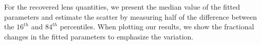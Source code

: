 For the recovered lens quantities, we present the median value of the fitted parameters and estimate the scatter by measuring half of the difference between the $16^{th}$ and $84^{th}$ percentiles. When plotting our results, we show the fractional changes in the fitted parameters to emphasize the variation.